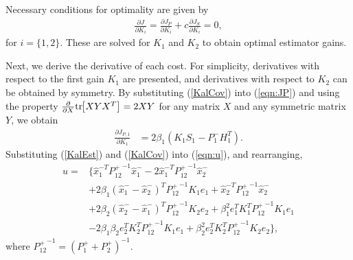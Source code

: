 \documentclass[letterpaper, 10pt, conference]{ieeeconf}
\newcommand{\bracket}[1]{\ensuremath{\left[ #1 \right]}}
\newcommand{\refeqn}[1]{(\ref{eqn:#1})}
\newcommand{\tr}[1]{\mathrm{tr}\ensuremath{\negthickspace\bracket{#1}}}
\newcommand{\deriv}[2]{\ensuremath{\frac{\partial #1}{\partial #2}}}
\newcommand{\EditTL}[1]{{\color{red}\protect #1}}
\begin{document}
Necessary conditions for optimality are given by
\begin{align}
\deriv{J}{K_i} = \deriv{J_P}{K_i} + c \deriv{J_S}{K_i} =0,\label{eqn:NCO}
\end{align}
for $i=\{1,2\}$. These are solved for $K_1$ and $K_2$ to obtain optimal estimator gains. 





Next, we derive the derivative of each cost. For simplicity, derivatives with respect to the first gain $K_1$ are presented, and derivatives with respect to $K_2$ can be obtained by symmetry. By substituting (\ref{KalCov}) into \refeqn{JP} and using the property $\frac{\partial}{\partial X}\tr{XYX^T}=2XY$ for any matrix $X$ and any symmetric matrix $Y$, we obtain
\begin{align}
\label{CostP}
\frac{\partial J_{P,1}}{\partial K_{1}}&=2\beta_1({K_1S_1-P_1^-H_1^T}).
\end{align}
%
Substituting (\ref{KalEst}) and (\ref{KalCov}) into \refeqn{u}, and rearranging, 
\begin{align}
u%
=&\{\hat x_1^{-T}{P^+_{12}}^{-1}\hat x_1^-
-2\hat x_1^{-T}{P^+_{12}}^{-1}\hat x_2^-\nonumber\\
&+2\beta_1(\hat x_1^{-}-\hat x_2^{-})^T{P^+_{12}}^{-1}K_1e_1
+\hat x_2^{-T}{P^+_{12}}^{-1}\hat x_2^-\nonumber\\
&+2\beta_2(\hat x_2^{-}-\hat x_1^{-})^T{P^+_{12}}^{-1}K_2e_2
+\beta_1^2e_1^TK_1^T{P^+_{12}}^{-1}K_1e_1\nonumber\\
&-2\beta_1\beta_2e_2^TK_2^T{P^+_{12}}^{-1}K_1e_1+\beta_2^2e_2^TK_2^T{P^+_{12}}^{-1}K_2e_2\},
\end{align}
where ${P^+_{12}}^{-1}=(P_1^++P_2^+)^{-1}$. 
\end{document}
